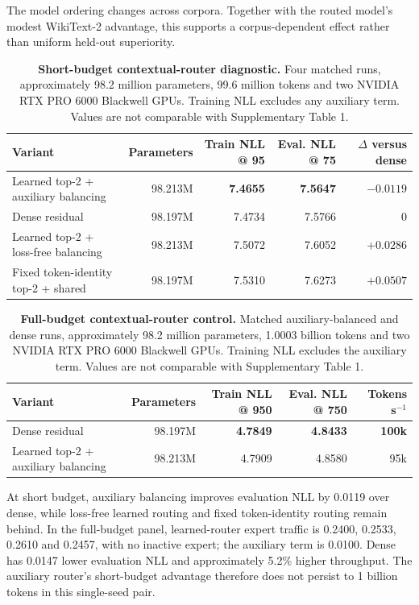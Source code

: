 \documentclass[11pt]{article}
\begin{document}
The model ordering changes across corpora. Together with the routed model's modest WikiText-2 advantage, this supports a corpus-dependent effect rather than uniform held-out superiority.

\begin{table}[H]
\centering
\footnotesize
\setlength{\tabcolsep}{4pt}
\caption{\textbf{Short-budget contextual-router diagnostic.} Four matched runs, approximately 98.2 million parameters, 99.6 million tokens and two NVIDIA RTX PRO 6000 Blackwell GPUs. Training NLL excludes any auxiliary term. Values are not comparable with Supplementary Table 1.}
\label{tab:s2}
\begin{tabular}{lrrrr}
\toprule
Variant & Parameters & Train NLL @ 95 & Eval. NLL @ 75 & $\Delta$ versus dense \\
\midrule
Learned top-2 + auxiliary balancing & 98.213M & \textbf{7.4655} & \textbf{7.5647} & $\mathbf{-0.0119}$ \\
Dense residual & 98.197M & 7.4734 & 7.5766 & 0 \\
Learned top-2 + loss-free balancing & 98.213M & 7.5072 & 7.6052 & $+0.0286$ \\
Fixed token-identity top-2 + shared & 98.197M & 7.5310 & 7.6273 & $+0.0507$ \\
\bottomrule
\end{tabular}
\end{table}

\begin{table}[H]
\centering
\footnotesize
\setlength{\tabcolsep}{4pt}
\caption{\textbf{Full-budget contextual-router control.} Matched auxiliary-balanced and dense runs, approximately 98.2 million parameters, 1.0003 billion tokens and two NVIDIA RTX PRO 6000 Blackwell GPUs. Training NLL excludes the auxiliary term. Values are not comparable with Supplementary Table 1.}
\label{tab:s3}
\begin{tabular}{lrrrr}
\toprule
Variant & Parameters & Train NLL @ 950 & Eval. NLL @ 750 & Tokens s$^{-1}$ \\
\midrule
Dense residual & 98.197M & \textbf{4.7849} & \textbf{4.8433} & \textbf{100k} \\
Learned top-2 + auxiliary balancing & 98.213M & 4.7909 & 4.8580 & 95k \\
\bottomrule
\end{tabular}
\end{table}

At short budget, auxiliary balancing improves evaluation NLL by 0.0119 over dense, while loss-free learned routing and fixed token-identity routing remain behind. In the full-budget panel, learned-router expert traffic is 0.2400, 0.2533, 0.2610 and 0.2457, with no inactive expert; the auxiliary term is 0.0100. Dense has 0.0147 lower evaluation NLL and approximately 5.2\% higher throughput. The auxiliary router's short-budget advantage therefore does not persist to 1 billion tokens in this single-seed pair.
\end{document}
